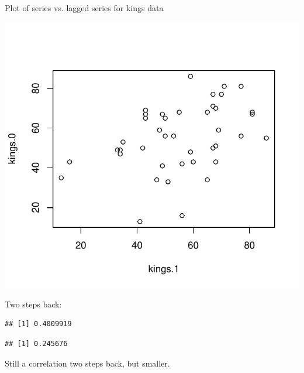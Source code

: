 \begin{frame}[fragile]{Plot of series vs. lagged series for kings data}
  
\begin{knitrout}
\color{fgcolor}\begin{kframe}
\begin{alltt}
\end{alltt}
\end{kframe}
\includegraphics[width=\maxwidth]{figure/partington-1} 

\end{knitrout}
  
\end{frame}

\begin{frame}[fragile]{Two steps back:}
  
\begin{knitrout}
\color{fgcolor}\begin{kframe}
\begin{alltt}
\hlstd{=}\hlstd{)}
\end{alltt}
\begin{verbatim}
## [1] 0.4009919
\end{verbatim}
\begin{alltt}
\hlkwb{=}\hlstd{(}
\hlkwb{=}\hlstd{)}
\hlstd{=}\hlstd{)}
\end{alltt}
\begin{verbatim}
## [1] 0.245676
\end{verbatim}
\end{kframe}
\end{knitrout}

Still a correlation two steps back, but smaller.

  
\end{frame}


